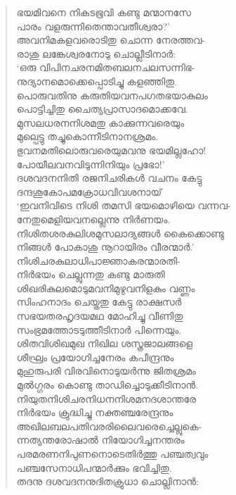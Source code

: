\begin{verse}
ഭയമിവനെ നികടഭൂവി കണ്ടു മന്മാനസേ\\
പാരം വളരുന്നിതെന്താവതീശ്വരാ?’\\
അവനിമകളവരൊടിതു ചൊന്ന നേരത്തവ-\\
രാശു ലങ്കേശ്വരനോടു ചൊല്ലീടിനാര്‍:\\
‘ഒരു വിപിനചരനമിതബലനചലസന്നിഭ-\\
നുദ്യാനമൊക്കെപ്പൊടിച്ചു കളഞ്ഞിതു.\\
പൊരുവതിനു കരുതിയവനപഗതഭയാകുലം\\
പൊട്ടിച്ചിതു ചൈത്യപ്രാസാദമൊക്കവേ.\\
മുസലധരനനിശമതു കാക്കുന്നവരെയും\\
മുല്പെട്ടു തച്ചുകൊന്നീടിനാനശ്രമം.\\
ഭുവനമതിലൊരുവരെയുമവനു ഭയമില്ലഹോ!\\
പോയീലവനവിടുന്നിനിയും പ്രഭോ!’\\
ദശവദനനിതി രജനിചരികള്‍ വചനം കേട്ടു\\
ദന്ദശൂകോപമക്രോധവിവശനായ്\\
‘ഇവനിവിടെ നിശി തമസി ഭയമൊഴിയെ വന്നവ-\\
നേതുമെളിയവനല്ലെന്നു നിര്‍ണയം.\\
നിശിതശരകുലിശമുസലാദ്യങ്ങള്‍ കൈക്കൊണ്ടു\\
നിങ്ങള്‍ പോകാശു നൂറായിരം വീരന്മാര്‍.’\\
നിശിചരകുലാധിപാജ്ഞാകരന്മാരതി-\\
നിര്‍ഭയം ചെല്ലുന്നതു കണ്ടു മാരുതി\\
ശിഖരികുലമൊടുമവനിമുഴുവനിളകും വണ്ണം\\
സിംഹനാദം ചെയ്തതു കേട്ടു രാക്ഷസര്‍\\
സഭയതരഹൃദയമഥ മോഹിച്ചു വീണിതു\\
സംഭ്രമത്തോടടുത്തീടിനാര്‍ പിന്നെയും.\\
ശിതവിശിഖമുഖ നിഖില ശസ്ത്രജാലങ്ങളെ\\
ശീഘ്രം പ്രയോഗിച്ചനേരം കപീന്ദ്രനും\\
മുഹുരുപരി വിരവിനൊടുയര്‍ന്നു ജിതശ്രമം\\
മുല്‍ഗ്ഗരം കൊണ്ടു താഡിച്ചൊടുക്കീടിനാന്‍.\\
നിയുതനിശിചരനിധനനിശമനദശാന്തരേ\\
നിര്‍ഭയം ക്രുദ്ധിച്ചു നക്തഞ്ചരേന്ദ്രനും\\
അഖിലബലപതിവരരിലൈവരെച്ചെല്ലുകെ-\\
ന്നത്യന്തരോഷാല്‍ നിയോഗിച്ചനന്തരം\\
പരമരണനിപുണനൊടെതിര്‍ത്തു പഞ്ചത്വവും\\
പഞ്ചസേനാധിപന്മാര്‍ക്കും ഭവിച്ചിതു.\\
തദനു ദശവദനനുദിതക്രുധാ ചൊല്ലിനാന്‍:\\

\end{verse}

